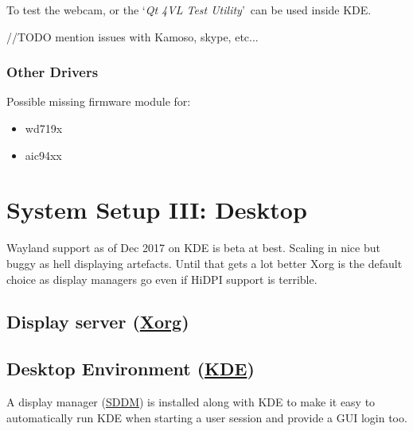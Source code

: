 To test the webcam,  or the \lq \textit{Qt 4VL Test Utility}\rq\ can be used inside KDE.

//TODO mention issues with Kamoso, skype, etc...

\subsubsection{Other Drivers}

Possible missing firmware module for:
\begin{itemize}[noitemsep,topsep=0pt,leftmargin=*]
    \item wd719x
    \item aic94xx
\end{itemize}


\section{System Setup III: Desktop}

Wayland support as of Dec 2017 on KDE is beta at best. Scaling in nice but buggy as hell displaying artefacts. Until that gets a lot better Xorg is the default choice as display managers go even if HiDPI support is terrible. 

\subsection{Display server (\href{https://wiki.archlinux.org/index.php/xorg}{Xorg})}


\subsection{Desktop Environment (\href{https://wiki.archlinux.org/index.php/KDE}{KDE})}

A display manager (\href{https://wiki.archlinux.org/index.php/SDDM}{SDDM}) is installed along with KDE to make it easy to automatically run KDE when starting a user session and provide a GUI login too.


